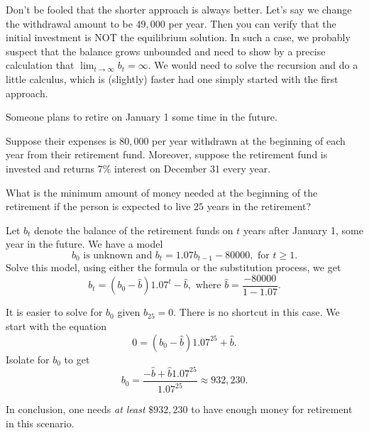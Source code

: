 \documentclass[../main.tex]{subfiles}
\begin{document}
\begin{exercise}
\begin{solution}
    Don't be fooled that the shorter approach is always better. Let's say we change the withdrawal amount to be \(49,000\) per year. Then you can verify that the initial investment is NOT the equilibrium solution. In such a case, we probably suspect that the balance grows unbounded and need to show by a precise calculation that \(\lim_{t \to \infty} b_{t} = \infty\). We would need to solve the recursion and do a little calculus, which is (slightly) faster had one simply started with the first approach.

  \end{solution}
\end{exercise}

\begin{exercise}
  Someone plans to retire on January 1 some time in the future.

  Suppose their expenses is \(80,000\) per year withdrawn at the beginning of each year from their retirement fund. Moreover, suppose the retirement fund is invested and returns \(7\%\) interest on December 31 every year. 

  What is the minimum amount of money needed at the beginning of the retirement if the person is expected to live \(25\) years in the retirement?

  \begin{solution}
    Let \(b_{t}\) denote the balance of the retirement funds on \(t\) years after January 1, some year in the future.  We have a model 
    \[
      b_{0} \text{ is unknown}  \text{ and } b_{t} = 1.07 b_{t-1} - 80000,\text{ for \(t \ge 1\)}.
    \]
    Solve this model, using either the formula or the substitution process, we get
    \[
      b_{t} = (b_{0} - \hat{b}) 1.07^{t} - \hat{b}, \text{ where } \hat{b} = \frac{-80000}{1 - 1.07}.
    \]

    It is easier to solve for \(b_{0}\) given \(b_{25} = 0\). There is no shortcut in this case. We start with the equation
    \[
      0 = (b_{0} - \hat{b}) 1.07^{25} + \hat{b}.
    \]
    Isolate for \(b_{0}\) to get 
    \[
      b_{0} = \frac{-\hat{b} + \hat{b} 1.07^{25}}{1.07^{25}} \approx 932,230.
    \]

    In conclusion, one needs \emph{at least} \(\$ 932,230\) to have enough money for retirement in this scenario.

  \end{solution}
\end{exercise}
\end{document}
